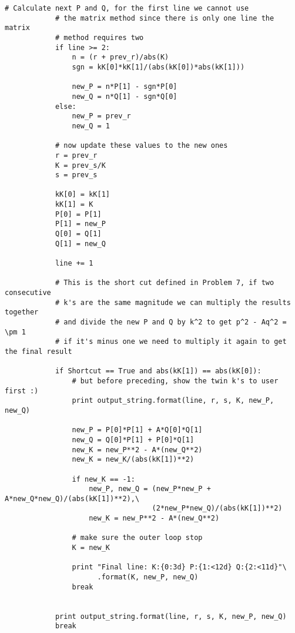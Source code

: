 \documentclass[aps,preprint,preprintnumbers,nofootinbib,showpacs,prd]{revtex4-1}
\begin{document}
\begin{Verbatim}[baselinestretch=0.75]
            # Calculate next P and Q, for the first line we cannot use
            # the matrix method since there is only one line the matrix
            # method requires two
            if line >= 2:
                n = (r + prev_r)/abs(K)
                sgn = kK[0]*kK[1]/(abs(kK[0])*abs(kK[1]))
            
                new_P = n*P[1] - sgn*P[0]
                new_Q = n*Q[1] - sgn*Q[0]
            else:
                new_P = prev_r
                new_Q = 1
                
            # now update these values to the new ones
            r = prev_r
            K = prev_s/K
            s = prev_s

            kK[0] = kK[1]
            kK[1] = K
            P[0] = P[1]
            P[1] = new_P
            Q[0] = Q[1]
            Q[1] = new_Q
            
            line += 1

            # This is the short cut defined in Problem 7, if two consecutive
            # k's are the same magnitude we can multiply the results together
            # and divide the new P and Q by k^2 to get p^2 - Aq^2 = \pm 1
            # if it's minus one we need to multiply it again to get the final result

            if Shortcut == True and abs(kK[1]) == abs(kK[0]):
                # but before preceding, show the twin k's to user first :)
                print output_string.format(line, r, s, K, new_P, new_Q)
                
                new_P = P[0]*P[1] + A*Q[0]*Q[1]
                new_Q = Q[0]*P[1] + P[0]*Q[1]
                new_K = new_P**2 - A*(new_Q**2)
                new_K = new_K/(abs(kK[1])**2)

                if new_K == -1:
                    new_P, new_Q = (new_P*new_P + A*new_Q*new_Q)/(abs(kK[1])**2),\
                                   (2*new_P*new_Q)/(abs(kK[1])**2)
                    new_K = new_P**2 - A*(new_Q**2)

                # make sure the outer loop stop
                K = new_K
                
                print "Final line: K:{0:3d} P:{1:<12d} Q:{2:<11d}"\
                      .format(K, new_P, new_Q)
                break
                    
            
            print output_string.format(line, r, s, K, new_P, new_Q)
            break
\end{Verbatim}
\end{document}
